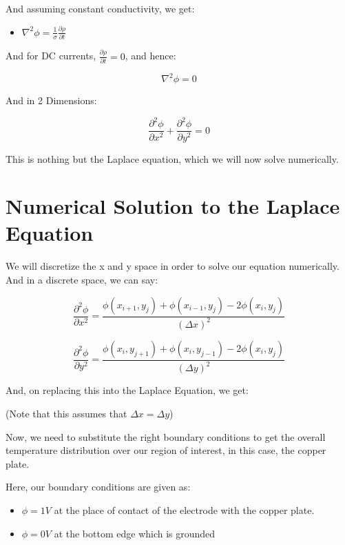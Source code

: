 \documentclass[12pt]{article}
\begin{document}
And assuming constant conductivity, we get:

\begin{itemize}
    \item $\nabla^2\phi = \frac{1}{\sigma} \frac{\partial \rho}{\partial t}$
\end{itemize}

And for DC currents, $\frac{\partial \rho}{\partial t} = 0$, and hence:

$$\nabla ^2 \phi = 0$$

And in 2 Dimensions:

$$\frac{\partial^2 \phi}{\partial x^2} + \frac{\partial^2 \phi}{\partial y^2} = 0$$

This is nothing but the Laplace equation, which we will now solve numerically.
\pagebreak
\section{Numerical Solution to the Laplace Equation}

\begin{center}
\end{center}

We will discretize the x and y space in order to solve our equation numerically. And in a discrete space, we can say:

$$\frac{\partial^2 \phi}{\partial x^2} = \frac{\phi(x_{i+1},y_{j})+\phi(x_{i-1},y_{j}) - 2\phi(x_i,y_j)}{(\Delta x)^2}$$

$$\frac{\partial^2 \phi}{\partial y^2} = \frac{\phi(x_{i},y_{j+1})+\phi(x_{i},y_{j-1}) - 2\phi(x_i,y_j)}{(\Delta y)^2}$$

And, on replacing this into the Laplace Equation, we get:

\begin{center}
\end{center}

(Note that this assumes that $\Delta x = \Delta y$)

Now, we need to substitute the right boundary conditions to get the overall temperature distribution over our region of interest, in this case, the copper plate.

Here, our boundary conditions are given as:

\begin{itemize}
    \item $\phi = 1V$ at the place of contact of the electrode with the copper plate.
    \item $\phi = 0V$ at the bottom edge which is grounded
\end{itemize}
\end{document}
